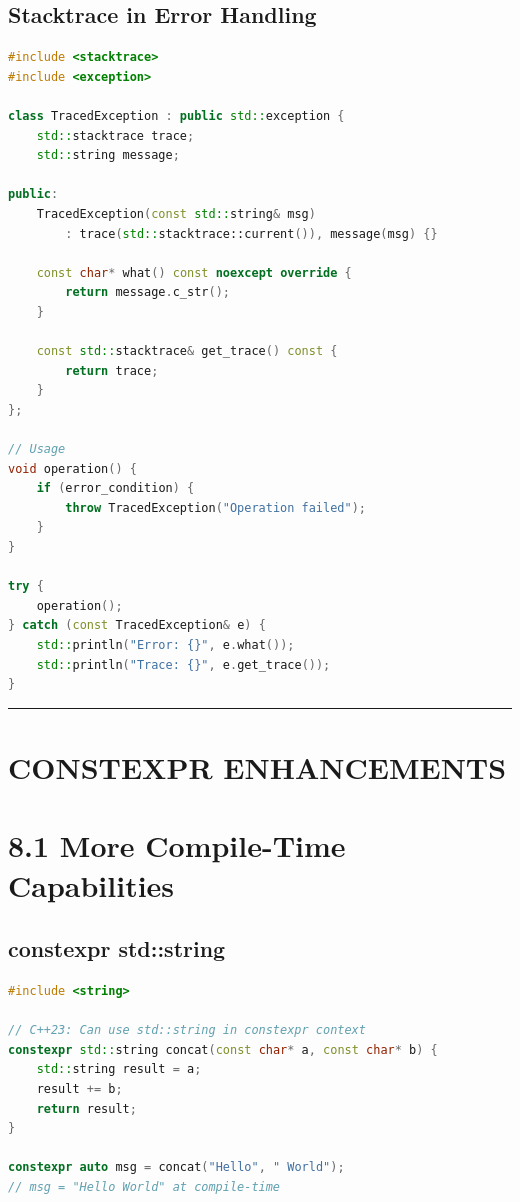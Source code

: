 \hypertarget{stacktrace-in-error-handling}{%
\subsection{Stacktrace in Error
Handling}\label{stacktrace-in-error-handling}}

\begin{lstlisting}[language={C++}]
#include <stacktrace>
#include <exception>

class TracedException : public std::exception {
    std::stacktrace trace;
    std::string message;
    
public:
    TracedException(const std::string& msg) 
        : trace(std::stacktrace::current()), message(msg) {}
    
    const char* what() const noexcept override {
        return message.c_str();
    }
    
    const std::stacktrace& get_trace() const {
        return trace;
    }
};

// Usage
void operation() {
    if (error_condition) {
        throw TracedException("Operation failed");
    }
}

try {
    operation();
} catch (const TracedException& e) {
    std::println("Error: {}", e.what());
    std::println("Trace: {}", e.get_trace());
}
\end{lstlisting}

\begin{center}\rule{0.5\linewidth}{0.5pt}\end{center}

\hypertarget{constexpr-enhancements}{%
\section{CONSTEXPR ENHANCEMENTS}\label{constexpr-enhancements}}

\hypertarget{more-compile-time-capabilities}{%
\section{8.1 More Compile-Time
Capabilities}\label{more-compile-time-capabilities}}

\hypertarget{constexpr-stdstring}{%
\subsection{constexpr std::string}\label{constexpr-stdstring}}

\begin{lstlisting}[language={C++}]
#include <string>

// C++23: Can use std::string in constexpr context
constexpr std::string concat(const char* a, const char* b) {
    std::string result = a;
    result += b;
    return result;
}

constexpr auto msg = concat("Hello", " World");
// msg = "Hello World" at compile-time
\end{lstlisting}

